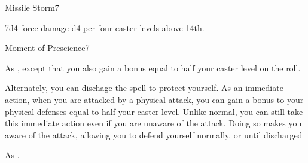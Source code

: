 \begin{spellsection}{Missile Storm}{7}
\begin{spellheader}
\end{spellheader}
\begin{spellcontent}
    \begin{spelltargetinginfo}
    \end{spelltargetinginfo}
    \begin{spelleffects}
        \spelleffect 7d4 force damage \add d4 per four caster levels above 14th.
    \end{spelleffects}
\end{spellcontent}
\begin{spellfooter}
\end{spellfooter}
\end{spellsection}

\begin{spellsection}{Moment of Prescience}{7}
\begin{spellheader}
\end{spellheader}
\begin{spellcontent}
    \begin{spelltargetinginfo}
    \end{spelltargetinginfo}
    \begin{spelleffects}
        \spelleffect As , except that you also gain a bonus equal to half your caster level on the roll.

        Alternately, you can dischage the spell to protect yourself. As an immediate action, when you are attacked by a physical attack, you can gain a bonus to your physical defenses equal to half your caster level. Unlike normal, you can still take this immediate action even if you are unaware of the attack. Doing so makes you aware of the attack, allowing you to defend yourself normally.
        \spelldur \durext or until discharged
    \end{spelleffects}
\end{spellcontent}
\begin{spellfooter}
    \spellnotes As .
\end{spellfooter}
\end{spellsection}

